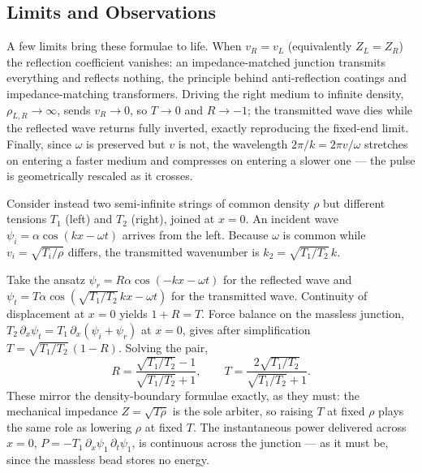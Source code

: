 \subsection{Limits and Observations}

A few limits bring these formulae to life. When $v_R = v_L$ (equivalently $Z_L = Z_R$) the reflection coefficient vanishes: an impedance-matched junction transmits everything and reflects nothing, the principle behind anti-reflection coatings and impedance-matching transformers. Driving the right medium to infinite density, $\rho_{L,R}\to\infty$, sends $v_R \to 0$, so $T \to 0$ and $R \to -1$; the transmitted wave dies while the reflected wave returns fully inverted, exactly reproducing the fixed-end limit. Finally, since $\omega$ is preserved but $v$ is not, the wavelength $2\pi/k = 2\pi v/\omega$ stretches on entering a faster medium and compresses on entering a slower one --- the pulse is geometrically rescaled as it crosses.

\begin{example}
Consider instead two semi-infinite strings of common density $\rho$ but different tensions $T_1$ (left) and $T_2$ (right), joined at $x=0$. An incident wave $\psi_i = \alpha\cos(kx - \omega t)$ arrives from the left. Because $\omega$ is common while $v_i = \sqrt{T_i/\rho}$ differs, the transmitted wavenumber is $k_2 = \sqrt{T_1/T_2}\,k$.

Take the ansatz $\psi_r = R\alpha\cos(-kx - \omega t)$ for the reflected wave and $\psi_t = T\alpha\cos(\sqrt{T_1/T_2}\,kx - \omega t)$ for the transmitted wave. Continuity of displacement at $x=0$ yields $1 + R = T$. Force balance on the massless junction, $T_2\,\partial_x\psi_t = T_1\,\partial_x(\psi_i+\psi_r)$ at $x=0$, gives after simplification $T = \sqrt{T_1/T_2}\,(1-R)$. Solving the pair,
\begin{equation}
    R = \frac{\sqrt{T_1/T_2} - 1}{\sqrt{T_1/T_2} + 1}, \qquad T = \frac{2\sqrt{T_1/T_2}}{\sqrt{T_1/T_2}+1}.
\end{equation}
These mirror the density-boundary formulae exactly, as they must: the mechanical impedance $Z = \sqrt{T\rho}$ is the sole arbiter, so raising $T$ at fixed $\rho$ plays the same role as lowering $\rho$ at fixed $T$. The instantaneous power delivered across $x=0$, $P = -T_1\,\partial_x\psi_1\,\partial_t\psi_1$, is continuous across the junction --- as it must be, since the massless bead stores no energy.
\end{example}

